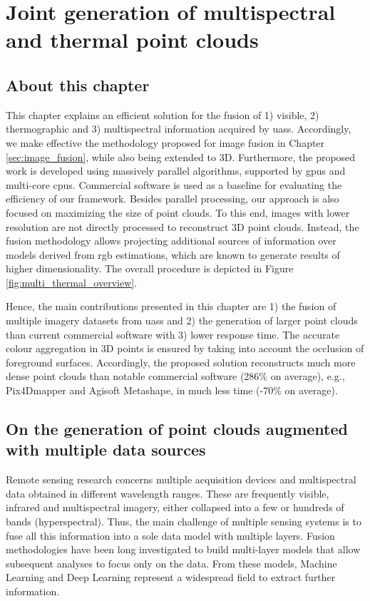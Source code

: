 \setchapterpreamble[u]{\margintoc}
\chapter{Joint generation of multispectral and thermal point clouds}
\label{sec:multispectral_pc}

\section*{About this chapter}

This chapter explains an efficient solution for the fusion of 1) visible, 2) thermographic and 3) multispectral information acquired by \acrshort{uas}s. Accordingly, we make effective the methodology proposed for image fusion in Chapter \ref{sec:image_fusion}, while also being extended to 3D. Furthermore, the proposed work is developed using massively parallel algorithms, supported by \acrshort{gpu}s and multi-core \acrshort{cpu}s. Commercial software is used as a baseline for evaluating the efficiency of our framework. Besides parallel processing, our approach is also focused on maximizing the size of point clouds. To this end, images with lower resolution are not directly processed to reconstruct 3D point clouds. Instead, the fusion methodology allows projecting additional sources of information over models derived from \acrshort{rgb} estimations, which are known to generate results of higher dimensionality. The overall procedure is depicted in Figure \ref{fig:multi_thermal_overview}.

Hence, the main contributions presented in this chapter are 1) the fusion of multiple imagery datasets from \acrshort{uas}s and 2) the generation of larger point clouds than current commercial software with 3) lower response time. The accurate colour aggregation in 3D points is ensured by taking into account the occlusion of foreground surfaces. Accordingly, the proposed solution reconstructs much more dense point clouds than notable commercial software (286\% on average), e.g., Pix4Dmapper and Agisoft Metashape, in much less time (-70\% on average). 

\section{On the generation of point clouds augmented with multiple data sources}

Remote sensing research concerns multiple acquisition devices and multispectral data obtained in different wavelength ranges. These are frequently visible, infrared and multispectral imagery, either collapsed into a few or hundreds of bands (hyperspectral). Thus, the main challenge of multiple sensing systems is to fuse all this information into a sole data model with multiple layers. Fusion methodologies have been long investigated to build multi-layer models that allow subsequent analyses to focus only on the data. From these models, Machine Learning \cite{padua_vineyard_2022} and Deep Learning \cite{jia_survey_2021, hu_hyperspectral_2022} represent a widespread field to extract further information. 

